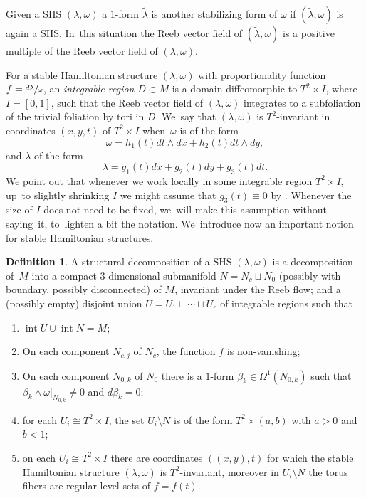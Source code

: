 \documentclass[11pt]{article}
\theoremstyle{definition}
\newtheorem{defi}[theorem]{Definition}
\begin{document}
Given a SHS $(\lambda,\omega)$ a $1$-form $\widetilde{\lambda}$ is another stabilizing form of $\omega$ if $(\widetilde{\lambda}, \omega)$ is again a SHS. In~this situation the Reeb vector field of $(\widetilde{\lambda},\omega)$ is a positive multiple of the Reeb vector field of $(\lambda,\omega)$.

For a stable Hamiltonian structure $(\lambda,\omega)$ with proportionality function $f=\sfrac{d\lambda}{\omega}$, an \textit{integrable region} $D\subset M$ is a domain diffeomorphic to $T^2\times I$, where $I=[0,1]$, such that the Reeb vector field of $(\lambda,\omega)$ integrates to a subfoliation of the trivial foliation by tori in $D$. We~say that $(\lambda,\omega)$ is $T^2$-invariant in coordinates $(x,y,t)$ of $T^2\times I$ when~$\omega$ is of the form
\begin{equation}\label{eq-omegaonreg}
\omega= h_1(t) dt\wedge dx + h_2(t) dt\wedge dy,
\end{equation}
and $\lambda$ of the form
\begin{equation}\label{eq-lambdaonreg}
\lambda = g_1(t) dx + g_2(t) dy + g_3(t)dt.
\end{equation}
We point out that whenever we work locally in some integrable region $T^2\times I$, up~to slightly shrinking $I$ we might assume that $g_3(t)\equiv 0$ by \cite[Lem.\,3.9]{CV1}. Whenever the size of $I$ does not need to be fixed, we~will make this assumption without saying~it, to~lighten a bit the notation. We~introduce now an important notion for stable Hamiltonian structures.
\begin{defi}\label{defn-strucdecom}
A structural decomposition of a SHS $(\lambda,\omega)$ is a decomposition of~$M$ into a compact $3$-dimensional submanifold $N=N_c \sqcup N_0$ (possibly with boundary, possibly disconnected) of $M$, invariant under the Reeb flow; and a (possibly empty) disjoint union $U=U_1\sqcup \cdots\sqcup U_r$ of integrable regions such that
\begin{enumerate}
\item\label{defn-strucdecom1} $\operatorname{int}U \cup \operatorname{int}N=M$;
\item\label{defn-strucdecom2} On each component $N_{c,j}$ of $N_c$, the function $f$ is non-vanishing;
\item\label{defn-strucdecom3} On each component $N_{0,k}$ of $N_0$ there is a $1$-form $\beta_k \in \Omega^1(N_{0,k})$ such that $\beta_k\wedge \omega|_{N_{0,k}}\neq 0$ and $d\beta_k=0$;
\item\label{defn-strucdecom4} for each $U_i\cong T^2\times I$, the set $U_i\setminus N$ is of the form $T^2\times (a,b)$ with $a>0$ and $b<1$;
\item\label{defn-strucdecom5} on each $U_i\cong T^2\times I$ there are coordinates $((x,y),t)$ for which the stable Hamiltonian structure $(\lambda,\omega)$ is $T^2$-invariant, moreover in $U_i\setminus N$ the torus fibers are regular level sets of $f=f(t)$.
\end{enumerate}
\end{defi}
\end{document}
